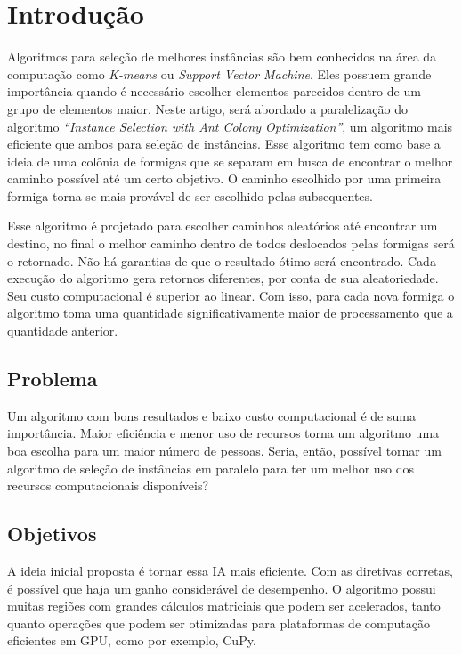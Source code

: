 \section{Introdução}
Algoritmos para seleção de melhores instâncias são bem conhecidos na área da computação como \emph{K-means} ou \emph{Support
Vector Machine}. Eles possuem grande importância quando é necessário escolher elementos parecidos dentro de um grupo de elementos
maior. Neste artigo, será abordado a paralelização do algoritmo \emph{``Instance Selection with Ant Colony Optimization''}, 
um algoritmo mais eficiente que ambos para seleção de instâncias.
Esse algoritmo tem como base a ideia de uma colônia de formigas que se separam em busca de encontrar o melhor caminho
possível até um certo objetivo. O caminho escolhido por uma primeira formiga torna-se mais provável de ser escolhido
pelas subsequentes.

Esse algoritmo é projetado para escolher caminhos aleatórios até encontrar um destino, no final o melhor caminho dentro de todos deslocados pelas formigas
será o retornado. Não há garantias de que o resultado ótimo será encontrado. Cada execução do algoritmo gera retornos diferentes, por conta
de sua aleatoriedade. Seu custo computacional é superior ao linear. Com isso, para cada nova formiga o algoritmo toma uma quantidade
significativamente maior de processamento que a quantidade anterior.

\subsection{Problema}
Um algoritmo com bons resultados e baixo custo computacional é de suma importância. Maior eficiência e menor uso de recursos
torna um algoritmo uma boa escolha para um maior número de pessoas. Seria, então, possível tornar um algoritmo de seleção de 
instâncias em paralelo para ter um melhor uso dos recursos computacionais disponíveis?


\subsection{Objetivos}

A ideia inicial proposta é tornar essa IA mais eficiente. Com as diretivas corretas, é possível que haja um ganho considerável de 
desempenho. O algoritmo possui muitas regiões com grandes cálculos matriciais que podem ser acelerados, tanto quanto operações que
podem ser otimizadas para plataformas de computação eficientes em GPU, como por exemplo, {CuPy}.

